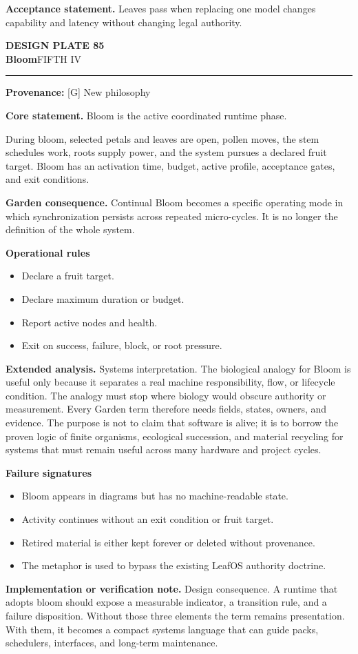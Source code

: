 \documentclass[10pt,letterpaper,oneside]{article}
\newcommand{\prov}[1]{\textcolor{gardenBlue}{\sffamily\footnotesize\textbf{Provenance:} #1}}
\newcommand{\platetitle}[3]{%
  \begin{minipage}[t][0.54in][t]{\textwidth}
  {\sffamily\bfseries\color{gardenDeep}\fontsize{9}{10}\selectfont DESIGN PLATE #1}\\[-1pt]
  {\sffamily\bfseries\color{gardenInk}\fontsize{16.5}{18}\selectfont #2}\hfill{\sffamily\color{gardenGreen}\large #3}
  \end{minipage}\vspace{-2pt}\hrule\vspace{5pt}}
\begin{document}
\begin{acceptbox}
\textbf{Acceptance statement.} Leaves pass when replacing one model changes capability and latency without changing legal authority.
\end{acceptbox}
\newpage
\platetitle{85}{Bloom}{FIFTH IV}
\prov{[G] New philosophy}
\fontsize{8.85}{10.45}\selectfont
\begin{corebox}
\textbf{Core statement.} Bloom is the active coordinated runtime phase.
\end{corebox}
During bloom, selected petals and leaves are open, pollen moves, the stem schedules work, roots supply power, and the system pursues a declared fruit target. Bloom has an activation time, budget, active profile, acceptance gates, and exit conditions.

\textbf{Garden consequence.} Continual Bloom becomes a specific operating mode in which synchronization persists across repeated micro-cycles. It is no longer the definition of the whole system.

\textbf{Operational rules}
\begin{itemize}
\item Declare a fruit target.
\item Declare maximum duration or budget.
\item Report active nodes and health.
\item Exit on success, failure, block, or root pressure.
\end{itemize}
\textbf{Extended analysis.} Systems interpretation. The biological analogy for Bloom is useful only because it separates a real machine responsibility, flow, or lifecycle condition. The analogy must stop where biology would obscure authority or measurement. Every Garden term therefore needs fields, states, owners, and evidence. The purpose is not to claim that software is alive; it is to borrow the proven logic of finite organisms, ecological succession, and material recycling for systems that must remain useful across many hardware and project cycles.

\textbf{Failure signatures}
\begin{itemize}
\item Bloom appears in diagrams but has no machine-readable state.
\item Activity continues without an exit condition or fruit target.
\item Retired material is either kept forever or deleted without provenance.
\item The metaphor is used to bypass the existing LeafOS authority doctrine.
\end{itemize}
\textbf{Implementation or verification note.} Design consequence. A runtime that adopts bloom should expose a measurable indicator, a transition rule, and a failure disposition. Without those three elements the term remains presentation. With them, it becomes a compact systems language that can guide packs, schedulers, interfaces, and long-term maintenance.
\end{document}

